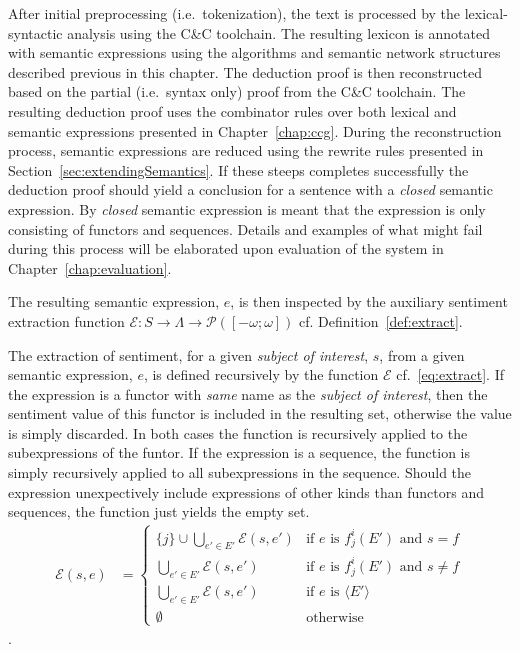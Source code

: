 After initial preprocessing (i.e.\ tokenization), the text is processed by the lexical-syntactic analysis using the C\&C toolchain. The resulting lexicon is annotated with semantic expressions using the algorithms and semantic network structures described previous in this chapter. The deduction proof is then reconstructed based on the partial (i.e.\ syntax only) proof from the C\&C toolchain. The resulting deduction proof uses the combinator rules over both lexical and semantic expressions presented in Chapter~\ref{chap:ccg}. During the reconstruction process, semantic expressions are reduced using the rewrite rules presented in Section~\ref{sec:extendingSemantics}. If these steeps completes successfully the deduction proof should yield a conclusion for a sentence with a \emph{closed} semantic expression. By \emph{closed} semantic expression is meant that the expression is only consisting of functors and sequences. Details and examples of what might fail during this process will be elaborated upon evaluation of the system in Chapter~\ref{chap:evaluation}.

The resulting semantic expression, $e$, is then inspected by the auxiliary sentiment extraction function $\mathcal{E} : S \to \Lambda \to \mathcal{P}([-\omega; \omega])$ cf. Definition~\ref{def:extract}.
\begin{definition}
	The extraction of sentiment, for a given \emph{subject of interest}, $s$, from a given semantic expression, $e$, is defined recursively by the function $\mathcal{E}$ cf.\ \ref{eq:extract}. If the expression is a functor with \emph{same} name as the \emph{subject of interest}, then the sentiment value of this functor is included in the resulting set, otherwise the value is simply discarded. In both cases the function is recursively applied to the subexpressions of the funtor. If the expression is a sequence, the function is simply recursively applied to all subexpressions in the sequence. Should the expression unexpectively include expressions of other kinds than functors and sequences, the function just yields the empty set.
\begin{align}
	\mathcal{E}(s, e) &=
	\begin{cases}    
	\{j\} \cup \bigcup_{e' \in E'} \mathcal{E}(s, e') & \text{if $e$ is $f_j^i(E')$ and $s = f$}  \\
	\bigcup_{e' \in E'} \mathcal{E}(s, e') & \text{if $e$ is $f_j^i(E')$ and $s \neq f$} \\
	\bigcup_{e' \in E'} \mathcal{E}(s, e') & \text{if $e$ is $\langle E' \rangle$}\\
	\emptyset & \text{otherwise}
	\end{cases}
	\label{eq:extract}
\end{align}
\label{def:extract}.
\done
\end{definition}

